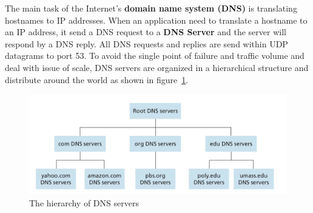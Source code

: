 \documentclass[a4paper, 11pt]{article}
\begin{document}
The main task of the Internet's \textbf{domain name system (DNS)} is translating hostnames to IP addresses. When an application need to translate a hostname to an IP address, it send a DNS request to a \textbf{DNS Server} and the server will respond by a DNS reply. All DNS requests and replies are send within UDP datagrams to port 53. To avoid the single point of failure and traffic volume and deal with issue of scale, DNS servers are organized in a hierarchical structure and distribute around the world as shown in figure~\ref{fig:dns-hierarchy}.\\

\begin{figure}[h]
\includegraphics[scale=0.6]{dns-hierarchical-organization.png}
\caption{The hierarchy of DNS servers}
\label{fig:dns-hierarchy}
\end{figure}
\end{document}
